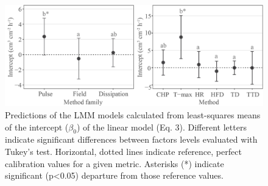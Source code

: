 \documentclass[11pt,twoside]{reedthesis}
\begin{document}
\newpage
\begin{figure}[hbt!]

{\centering \includegraphics[width=1\linewidth]{figure/appendixA1/fig3} 

}

\caption[Predictions of the LMM models calculated from least-squares means of the intercept ($\beta_{0}$) of the linear model.]{Predictions of the LMM models calculated from least-squares means of the intercept ($\beta_{0}$) of the linear model (Eq. 3). Different letters indicate significant differences between factors levels evaluated with Tukey’s test. Horizontal, dotted lines indicate reference, perfect calibration values for a given metric. Asterisks (*) indicate significant (p<0.05) departure from those reference values.}\label{fig:apa13}
\end{figure}\newpage
\begingroup\fontsize{6}{8}\selectfont
\end{document}
